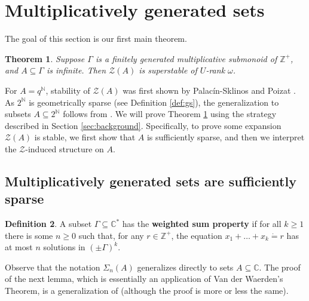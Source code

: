 \documentclass{amsart}
\def\seq{\subseteq}
\newcommand{\de}{\mathbin{\dot{=}}}
\newcommand{\cZ}{\mathcal{Z}}
\def\C{\mathbb C}
\def\N{\mathbb N}
\def\Z{\mathbb Z}
\newtheorem{theorem}{Theorem}[section]
\theoremstyle{definition}
\newtheorem{definition}[theorem]{Definition}
\begin{document}
\section{Multiplicatively generated sets}\label{sec:MGG}

The goal of this section is our first main theorem.

\begin{theorem}\label{thm:CMS}
Suppose $\Gamma$ is a finitely generated multiplicative submonoid of $\Z^+$, and $A\seq\Gamma$ is infinite. Then $\cZ(A)$ is superstable of $U$-rank $\omega$.
\end{theorem}

For $A=q^{\N}$, stability of $\cZ(A)$ was first shown by Palac\'{i}n-Sklinos \cite{PaSk} and Poizat \cite{PoZ}. As $2^{\N}$ is geometrically sparse (see Definition \ref{def:gs}), the generalization to subsets $A\seq 2^{\N}$ follows from \cite{CoSS}. We will prove Theorem \ref{thm:CMS} using the strategy described in Section \ref{sec:background}. Specifically, to prove some expansion $\cZ(A)$ is stable, we first show that $A$ is sufficiently sparse, and then we interpret the $\cZ$-induced structure on $A$.

\subsection{Multiplicatively generated sets are sufficiently sparse}



\begin{definition}
A subset $\Gamma\seq\C^*$ has the \textbf{weighted sum property} if for all $k\geq 1$ there is some $n\geq 0$ such that, for any $r\in\Z^+$, the equation $x_1+\ldots+x_k\de r$ has at most $n$ solutions in $(\pm \Gamma)^k$. 
\end{definition}

Observe that the notation $\Sigma_n(A)$ generalizes directly to sets $A\seq \C$. The proof of the next lemma, which is essentially an application of Van der Waerden's Theorem, is a generalization of \cite[Lemma 4]{JaNa} (although the proof is more or less the same). 
\end{document}
